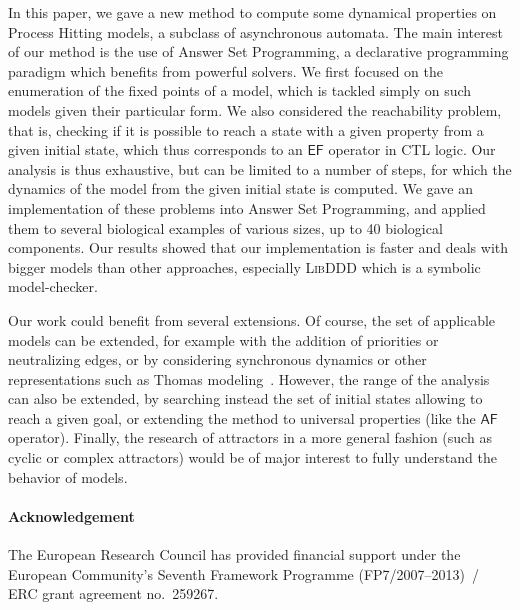 In this paper, we gave a new method to compute some dynamical properties
on Process Hitting models, a subclass of asynchronous automata.
The main interest of our method is the use of Answer Set Programming,
a declarative programming paradigm which benefits from powerful solvers.
We first focused on the enumeration of the fixed points of a model,
which is tackled simply on such models given their particular form.
We also considered the reachability problem, that is,
checking if it is possible to reach a state with a given property
from a given initial state,
which thus corresponds to an $\mathsf{EF}$ operator in CTL logic.
Our analysis is thus exhaustive, but can be limited to a number of steps,
for which the dynamics of the model from the given initial state is computed.
We gave an implementation of these problems into Answer Set Programming,
and applied them to several biological examples of various sizes, up to
40 biological components.
Our results showed that our implementation is faster and deals with bigger models
than other approaches, especially \textsc{LibDDD} which is a symbolic model-checker.

Our work could benefit from several extensions.
Of course, the set of applicable models can be extended,
for example with the addition
of priorities or neutralizing edges,
or by considering synchronous dynamics or other representations
such as Thomas modeling~\cite{BernotSemBRN}.
However, the range of the analysis can also be extended,
by searching instead the set of initial states
allowing to reach a given goal,
or extending the method to universal properties (like the $\mathsf{AF}$ operator).
Finally, the research of attractors in a more general fashion
(such as cyclic or complex attractors)
would be of major interest to fully understand the behavior of models.

{\small
\paragraph{Acknowledgement}
The European Research Council has provided financial support
under the European Community's Seventh Framework Programme (FP7/2007--2013)~/
ERC grant agreement no.~259267.
}
